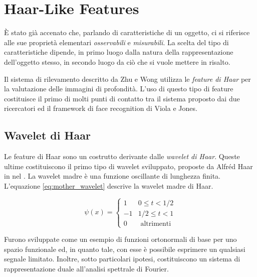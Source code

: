 
\chapter{Haar-Like Features}
\label{chap:features}
    È stato già accenato che, parlando di caratteristiche di un oggetto, ci si riferisce alle sue proprietà elementari \emph{osservabili} e \emph{misurabili}.
    La scelta del tipo di caratteristiche dipende, in primo luogo dalla natura della rappresentazione dell'oggetto stesso, in secondo luogo da ciò che si vuole mettere in risalto.

    Il sistema di rilevamento descritto da Zhu e Wong utilizza le \emph{feature di Haar} per la valutazione delle immagini di profondità.
    L'uso di questo tipo di feature costituisce il primo di molti punti di contatto tra il sistema proposto dai due ricercatori ed il framework di face recognition di Viola e Jones. 

    \section{Wavelet di Haar}
    \label{sec:haar_wavelets}
        Le feature di Haar sono un costrutto derivante dalle \emph{wavelet di Haar}.
        Queste ultime costituiscono il primo tipo di wavelet sviluppato, proposte da Alfréd Haar in \cite{Haar10} nel \citeyear{Haar10}.
        La wavelet madre è una funzione oscillante di lunghezza finita.
        L'equazione \ref{eq:mother_wavelet} descrive la wavelet madre di Haar.

        \begin{equation}
            \label{eq:mother_wavelet}
            \psi(x) = 
            \begin{cases}
                1 & 0 \leq t < 1/2 \\
                -1 & 1/2 \leq t < 1 \\
                0 & \text { altrimenti }
            \end{cases}
        \end{equation}

        Furono sviluppate come un esempio di funzioni ortonormali di base per uno spazio funzionale ed, in quanto tale, con esse è possibile esprimere un qualsiasi segnale limitato.
        Inoltre, sotto particolari ipotesi, costituiscono un sistema di rappresentazione duale all'analisi spettrale di Fourier.

